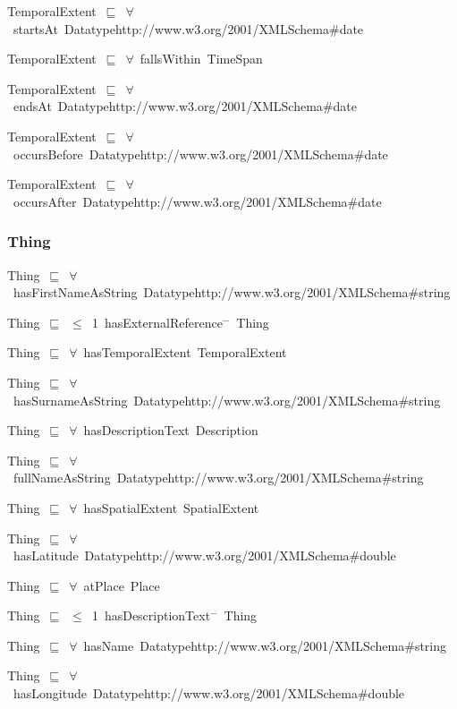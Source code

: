 \documentclass{article}
\begin{document}
TemporalExtent~\ensuremath{\sqsubseteq}~\ensuremath{\forall}~startsAt~Datatypehttp://www.w3.org/2001/XMLSchema#date~

TemporalExtent~\ensuremath{\sqsubseteq}~\ensuremath{\forall}~fallsWithin~TimeSpan~

TemporalExtent~\ensuremath{\sqsubseteq}~\ensuremath{\forall}~endsAt~Datatypehttp://www.w3.org/2001/XMLSchema#date~

TemporalExtent~\ensuremath{\sqsubseteq}~\ensuremath{\forall}~occursBefore~Datatypehttp://www.w3.org/2001/XMLSchema#date~

TemporalExtent~\ensuremath{\sqsubseteq}~\ensuremath{\forall}~occursAfter~Datatypehttp://www.w3.org/2001/XMLSchema#date~

\subsubsection*{Thing}

Thing~\ensuremath{\sqsubseteq}~\ensuremath{\forall}~hasFirstNameAsString~Datatypehttp://www.w3.org/2001/XMLSchema#string~

Thing~\ensuremath{\sqsubseteq}~\ensuremath{\leq}~1~hasExternalReference\ensuremath{^-}~Thing~

Thing~\ensuremath{\sqsubseteq}~\ensuremath{\forall}~hasTemporalExtent~TemporalExtent~

Thing~\ensuremath{\sqsubseteq}~\ensuremath{\forall}~hasSurnameAsString~Datatypehttp://www.w3.org/2001/XMLSchema#string~

Thing~\ensuremath{\sqsubseteq}~\ensuremath{\forall}~hasDescriptionText~Description~

Thing~\ensuremath{\sqsubseteq}~\ensuremath{\forall}~fullNameAsString~Datatypehttp://www.w3.org/2001/XMLSchema#string~

Thing~\ensuremath{\sqsubseteq}~\ensuremath{\forall}~hasSpatialExtent~SpatialExtent~

Thing~\ensuremath{\sqsubseteq}~\ensuremath{\forall}~hasLatitude~Datatypehttp://www.w3.org/2001/XMLSchema#double~

Thing~\ensuremath{\sqsubseteq}~\ensuremath{\forall}~atPlace~Place~

Thing~\ensuremath{\sqsubseteq}~\ensuremath{\leq}~1~hasDescriptionText\ensuremath{^-}~Thing~

Thing~\ensuremath{\sqsubseteq}~\ensuremath{\forall}~hasName~Datatypehttp://www.w3.org/2001/XMLSchema#string~

Thing~\ensuremath{\sqsubseteq}~\ensuremath{\forall}~hasLongitude~Datatypehttp://www.w3.org/2001/XMLSchema#double~
\end{document}
